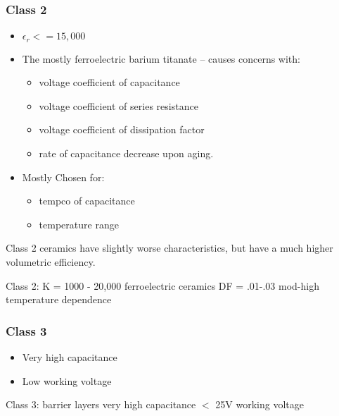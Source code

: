         \subsubsection{Class 2}
            \begin{itemize}
                \item $\epsilon _r <= 15,000$ 
                \item The mostly ferroelectric barium titanate -- causes concerns with:
                \begin{itemize}
                    \item voltage coefficient of capacitance
                    \item voltage coefficient of series resistance
                    \item voltage coefficient of dissipation factor
                    \item rate of capacitance decrease upon aging.
                \end{itemize}
                \item Mostly Chosen for:
                \begin{itemize}
                    \item tempco of capacitance
                    \item temperature range
                \end{itemize}
            \end{itemize} \cite[Ch 3 Sec VI]{cerMaterials}

            Class 2 ceramics have slightly worse characteristics, but have a much higher volumetric efficiency.  \cite{atCer_tempco}

            Class 2:
            K = 1000 - 20,000
            ferroelectric ceramics
            DF = .01-.03
            mod-high temperature dependence \cite{hist_cerFilt}

        \subsubsection{Class 3}
            \begin{itemize}
            \item Very high capacitance
            \item Low working voltage
            \end{itemize} \cite[Ch 3 Sec VI]{cerMaterials}

            Class 3:
            barrier layers
            very high capacitance
            $<$ 25V working voltage \cite{hist_cerFilt}
